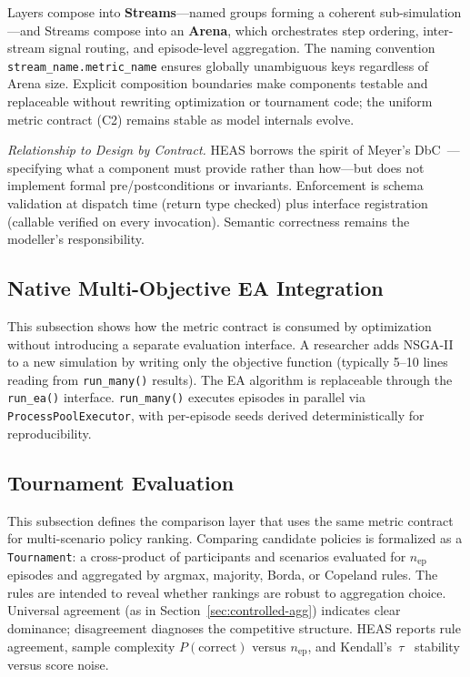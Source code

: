 \documentclass{wscpaperproc}
\begin{document}
Layers compose into \textbf{Streams}---named groups forming a coherent
sub-simulation---and Streams compose into an \textbf{Arena}, which orchestrates
step ordering, inter-stream signal routing, and episode-level aggregation. The
naming convention \texttt{stream\_name.metric\_name} ensures globally unambiguous
keys regardless of Arena size. Explicit composition boundaries make components
testable and replaceable without rewriting optimization or tournament code;
the uniform metric contract (C2) remains stable as model internals evolve.

\textit{Relationship to Design by Contract.} HEAS borrows the spirit of
Meyer's DbC~\cite{meyer1997object}---specifying what a component must provide
rather than how---but does not implement formal pre/postconditions or invariants.
Enforcement is schema validation at dispatch time (return type checked) plus
interface registration (callable verified on every invocation). Semantic
correctness remains the modeller's responsibility.

\subsection{Native Multi-Objective EA Integration}

This subsection shows how the metric contract is consumed by optimization
without introducing a separate evaluation interface. A researcher adds
NSGA-II to a new simulation by writing only the objective function (typically
5--10 lines reading from \texttt{run\_many()} results). The EA algorithm is
replaceable through the \texttt{run\_ea()} interface. \texttt{run\_many()}
executes episodes in parallel via \texttt{ProcessPoolExecutor}, with per-episode
seeds derived deterministically for reproducibility.

\subsection{Tournament Evaluation}

This subsection defines the comparison layer that uses the same metric contract
for multi-scenario policy ranking. Comparing candidate policies is formalized as a \texttt{Tournament}: a
cross-product of participants and scenarios evaluated for $n_\text{ep}$
episodes and aggregated by argmax, majority, Borda, or Copeland rules. The
rules are intended to reveal whether rankings are robust to aggregation choice.
Universal agreement (as in Section~\ref{sec:controlled-agg}) indicates clear dominance;
disagreement diagnoses the competitive structure.
HEAS reports rule agreement, sample complexity $P(\text{correct})$ versus
$n_\text{ep}$, and Kendall's~$\tau$~\cite{kendall1938new} stability versus
score noise.
\end{document}
